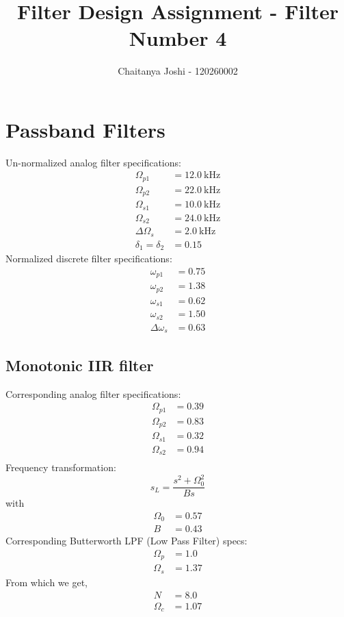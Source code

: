 \documentclass[12pt,a4paper]{scrartcl}
\title{ \vspace{-8ex} \Large Filter Design Assignment - Filter Number 4}
\subtitle{Chaitanya Joshi - 120260002}
\date{\vspace{-7ex}}
\begin{document}
	\maketitle
	\noindent
	\section{Passband Filters}
		Un-normalized analog filter specifications:
		\begin{align}
			\Omega_{p1} &= 12.0 \ \text{kHz} \\
			\Omega_{p2} &= 22.0 \ \text{kHz} \\
			\Omega_{s1} &= 10.0 \ \text{kHz} \\
			\Omega_{s2} &= 24.0 \ \text{kHz} \\
			\Delta \Omega_s &= 2.0 \ \text{kHz} \\
			\delta_1 = \delta_2 &= 0.15
		\end{align}
		Normalized discrete filter specifications:
		\begin{align}
			\omega_{p1} &= 0.75 \\
			\omega_{p2} &= 1.38 \\
			\omega_{s1} &= 0.62 \\
			\omega_{s2} &= 1.50 \\
			\Delta \omega_s &= 0.63
		\end{align}
		\subsection{Monotonic IIR filter}
			Corresponding analog filter specifications:
			\begin{align}
				\Omega_{p1} &= 0.39 \\
				\Omega_{p2} &= 0.83 \\
				\Omega_{s1} &= 0.32 \\
				\Omega_{s2} &= 0.94 \\
			\end{align}
			Frequency transformation: 
			\begin{equation}
			s_L = \frac{s^2 + \Omega_0^2}{B s}
			\end{equation}
			with
			\begin{align}
				\Omega_0 &= 0.57 \\
				B &= 0.43
			\end{align}
			Corresponding Butterworth LPF (Low Pass Filter) specs:
			\begin{align}
				\Omega_p &= 1.0 \\
				\Omega_s &= 1.37
			\end{align}
			From which we get,
			\begin{align}
				N &= 8.0 \\
				\Omega_c &= 1.07 
			\end{align}
\end{document}
